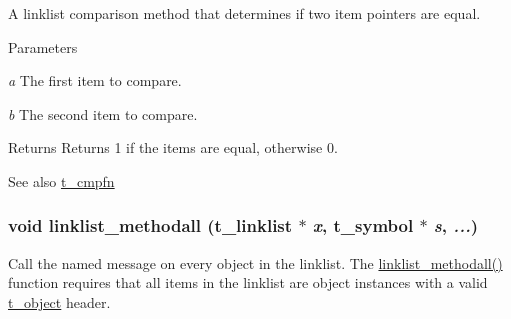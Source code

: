 A linklist comparison method that determines if two item pointers are equal. 
\begin{DoxyParams}{Parameters}
\item[{\em a}]The first item to compare. \item[{\em b}]The second item to compare. \end{DoxyParams}
\begin{DoxyReturn}{Returns}
Returns 1 if the items are equal, otherwise 0.
\end{DoxyReturn}
\begin{DoxySeeAlso}{See also}
\hyperlink{group__datastore_gaaf4ae6dd800a2be9abd645cf70aeb38f}{t\_\-cmpfn} 
\end{DoxySeeAlso}
\hypertarget{group__linklist_ga10bd8d367039e3e4b90fe720e83d0edf}{
\subsubsection[{linklist\_\-methodall}]{\setlength{\rightskip}{0pt plus 5cm}void linklist\_\-methodall ({\bf t\_\-linklist} $\ast$ {\em x}, \/  {\bf t\_\-symbol} $\ast$ {\em s}, \/   {\em ...})}}
\label{group__linklist_ga10bd8d367039e3e4b90fe720e83d0edf}


Call the named message on every object in the linklist. The \hyperlink{group__linklist_ga10bd8d367039e3e4b90fe720e83d0edf}{linklist\_\-methodall()} function requires that all items in the linklist are object instances with a valid \hyperlink{structt__object}{t\_\-object} header.


